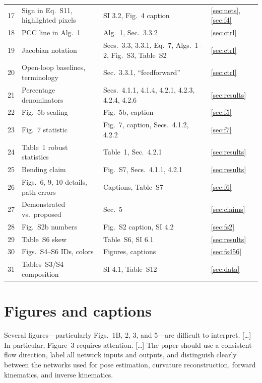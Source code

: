 \documentclass[10pt,a4paper]{article}
\begin{document}
\begin{longtable}{p{1.0cm}p{5.6cm}p{8.4cm}p{1.2cm}}
17 & Sign in Eq.~S11, highlighted pixels & SI 3.2, Fig.~4 caption & \ref{sec:nets}, \ref{sec:f4}\\
18 & PCC line in Alg.~1 & Alg.~1, Sec.~3.3.2 & \ref{sec:ctrl}\\
19 & Jacobian notation & Secs.~3.3, 3.3.1, Eq.~7, Algs.~1--2, Fig.~S3, Table~S2 & \ref{sec:ctrl}\\
20 & Open-loop baselines, terminology & Sec.~3.3.1, ``feedforward'' & \ref{sec:ctrl}\\
21 & Percentage denominators & Secs.~4.1.1, 4.1.4, 4.2.1, 4.2.3, 4.2.4, 4.2.6 & \ref{sec:results}\\
22 & Fig.~5b scaling & Fig.~5b, caption & \ref{sec:f5}\\
23 & Fig.~7 statistic & Fig.~7, caption, Secs.~4.1.2, 4.2.2 & \ref{sec:f7}\\
24 & Table~1 robust statistics & Table~1, Sec.~4.2.1 & \ref{sec:results}\\
25 & Bending claim & Fig.~S7, Secs.~4.1.1, 4.2.1 & \ref{sec:results}\\
26 & Figs.~6, 9, 10 details, path errors & Captions, Table~S7 & \ref{sec:f6}\\
27 & Demonstrated vs.\ proposed & Sec.~5 & \ref{sec:claims}\\\midrule
28 & Fig.~S2b numbers & Fig.~S2 caption, SI 4.2 & \ref{sec:fs2}\\
29 & Table~S6 skew & Table~S6, SI 6.1 & \ref{sec:results}\\
30 & Figs.~S4--S6 IDs, colors & Figures, captions & \ref{sec:fs456}\\
31 & Tables~S3/S4 composition & SI 4.1, Table~S12 & \ref{sec:data}\\
\bottomrule
\end{longtable}
\normalsize

\clearpage
\section{Figures and captions}\label{sec:figs}
\begin{rev}
Several figures---particularly Figs.~1B, 2, 3, and 5---are difficult to interpret. [\dots] In particular, Figure~3 requires attention. [\dots] The paper should use a consistent flow direction, label all network inputs and outputs, and distinguish clearly between the networks used for pose estimation, curvature reconstruction, forward kinematics, and inverse kinematics.
\end{rev}
\end{document}
